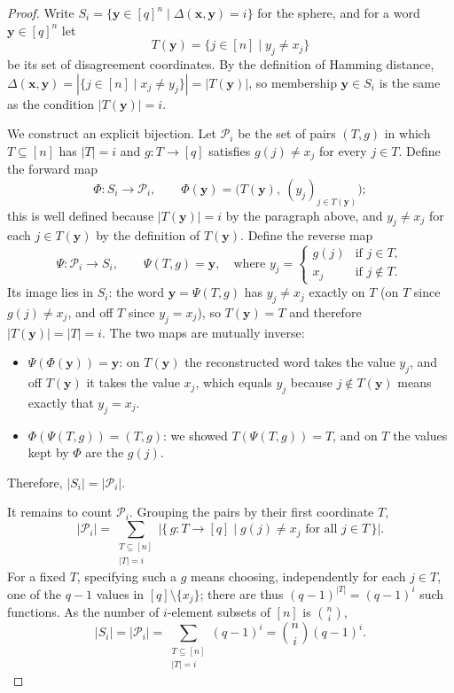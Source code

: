 \begin{proof}
  \leanok
  Write $S_i = \{\mathbf{y} \in [q]^n \mid \Delta(\mathbf{x}, \mathbf{y}) = i\}$ for the sphere,
  and for a word $\mathbf{y} \in [q]^n$ let
  \[
    T(\mathbf{y}) = \{j \in [n] \mid y_j \neq x_j\}
  \]
  be its set of disagreement coordinates. By the definition of Hamming distance,
  $\Delta(\mathbf{x}, \mathbf{y}) = |\{j \in [n] \mid x_j \neq y_j\}| = |T(\mathbf{y})|$, so
  membership $\mathbf{y} \in S_i$ is the same as the condition $|T(\mathbf{y})| = i$.

  We construct an explicit bijection. Let $\mathcal{P}_i$ be the set of pairs $(T, g)$ in which $T \subseteq [n]$
  has $|T| = i$ and $g : T \to [q]$ satisfies $g(j) \neq x_j$ for every $j \in T$. Define the
  forward map
  \[
    \Phi : S_i \to \mathcal{P}_i, \qquad
    \Phi(\mathbf{y}) = \bigl(T(\mathbf{y}),\ (y_j)_{j \in T(\mathbf{y})}\bigr);
  \]
  this is well defined because $|T(\mathbf{y})| = i$ by the paragraph above, and $y_j \neq x_j$
  for each $j \in T(\mathbf{y})$ by the definition of $T(\mathbf{y})$. Define the reverse map
  \[
    \Psi : \mathcal{P}_i \to S_i, \qquad
    \Psi(T, g) = \mathbf{y}, \quad\text{where } y_j =
      \begin{cases} g(j) & \text{if } j \in T, \\ x_j & \text{if } j \notin T. \end{cases}
  \]
  Its image lies in $S_i$: the word $\mathbf{y} = \Psi(T, g)$ has $y_j \neq x_j$ exactly on $T$
  (on $T$ since $g(j) \neq x_j$, and off $T$ since $y_j = x_j$), so $T(\mathbf{y}) = T$ and
  therefore $|T(\mathbf{y})| = |T| = i$. The two maps are mutually inverse:
  \begin{itemize}
    \item $\Psi(\Phi(\mathbf{y})) = \mathbf{y}$: on $T(\mathbf{y})$ the reconstructed word takes
      the value $y_j$, and off $T(\mathbf{y})$ it takes the value $x_j$, which equals $y_j$
      because $j \notin T(\mathbf{y})$ means exactly that $y_j = x_j$.
    \item $\Phi(\Psi(T, g)) = (T, g)$: we showed $T(\Psi(T, g)) = T$, and on $T$ the values kept
      by $\Phi$ are the $g(j)$.
  \end{itemize}
  Therefore, $|S_i| = |\mathcal{P}_i|$.

  It remains to count $\mathcal{P}_i$. Grouping the pairs by their first coordinate $T$,
  \[
    |\mathcal{P}_i| = \sum_{\substack{T \subseteq [n] \\ |T| = i}}
      \bigl|\{\, g : T \to [q] \mid g(j) \neq x_j \text{ for all } j \in T \,\}\bigr|.
  \]
  For a fixed $T$, specifying such a $g$ means choosing, independently for each $j \in T$, one of
  the $q - 1$ values in $[q] \setminus \{x_j\}$; there are thus $(q-1)^{|T|} = (q-1)^i$ such
  functions. As the number of $i$-element subsets of $[n]$ is $\binom{n}{i}$,
  \[
    |S_i| = |\mathcal{P}_i|
      = \sum_{\substack{T \subseteq [n] \\ |T| = i}} (q-1)^i
      = \binom{n}{i}(q-1)^i.
  \]
\end{proof}

